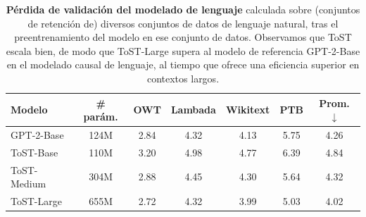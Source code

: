 \documentclass[../../book-main_es.tex]{subfiles}
\begin{document}
\begin{table}[!htbp]
\centering
\begin{tabular}{@{}lcccccc@{}}
\toprule
Modelo & \# parám. & OWT & Lambada & Wikitext & PTB & Prom. $\downarrow$
\\ \midrule
GPT-2-Base & 124M & 2.84 & 4.32 & 4.13 & 5.75 & 4.26 \\
ToST-Base & 110M & 3.20 & 4.98 & 4.77 & 6.39 & 4.84 \\
ToST-Medium & 304M & 2.88 & 4.45 & 4.30 & 5.64 & 4.32 \\
ToST-Large & 655M & 2.72 & 4.32 & 3.99 & 5.03 & 4.02 \\ \bottomrule
\end{tabular}%
\caption{\small\textbf{Pérdida de validación del modelado de lenguaje} calculada sobre
(conjuntos de retención de) diversos conjuntos de datos de lenguaje natural, tras
el preentrenamiento del modelo en ese conjunto de datos. Observamos que ToST escala
bien, de modo que ToST-Large supera al modelo de referencia GPT-2-Base en el modelado causal
de lenguaje, al tiempo que ofrece una eficiencia superior en contextos largos.} 
\label{tab:tost_lm}
\end{table}
\end{document}
